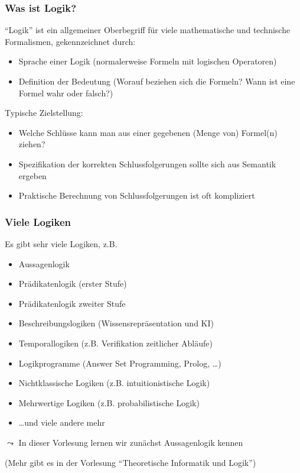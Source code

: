 \documentclass[aspectratio=1610,onlymath]{beamer}
\begin{document}
\begin{frame}\frametitle{Was ist Logik?}
\pause

"`Logik"' ist ein allgemeiner Oberbegriff für viele mathematische und technische Formalismen,
gekennzeichnet durch:
\begin{itemize}
\item {} Sprache einer Logik (normalerweise Formeln mit logischen Operatoren)
\item {} Definition der Bedeutung (Worauf beziehen sich die Formeln? Wann ist eine Formel wahr oder falsch?)
\end{itemize}\bigskip\pause

Typische Zielstellung: 
\begin{itemize}
\item Welche Schlüsse kann man aus einer gegebenen (Menge von) Formel(n) ziehen?
\item Spezifikation der korrekten Schlussfolgerungen sollte sich aus Semantik ergeben
\item Praktische Berechnung von Schlussfolgerungen ist oft kompliziert
\end{itemize}

\end{frame}

\begin{frame}\frametitle{Viele Logiken}

Es gibt sehr viele Logiken, z.B.
\begin{itemize}
\item Aussagenlogik
\item Prädikatenlogik (erster Stufe)
\item Prädikatenlogik zweiter Stufe
\item Beschreibungslogiken (Wissensrepräsentation und KI)
\item Temporallogiken (z.B. Verifikation zeitlicher Abläufe)
\item Logikprogramme (Answer Set Programming, Prolog, \ldots)
\item Nichtklassische Logiken (z.B. intuitionistische Logik)
\item Mehrwertige Logiken (z.B. probabilistische Logik)
\item \ldots und viele andere mehr
\end{itemize}

$\leadsto$ In dieser Vorlesung lernen wir zunächst \alert{Aussagenlogik} kennen
\bigskip

(Mehr gibt es in der Vorlesung "`Theoretische Informatik und Logik"')

\end{frame}
\end{document}
